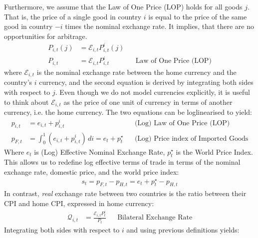 Furthermore, we assume that the Law of One Price (LOP) holds for all goods $j$. That is, the price of a single good in country $i$ is equal to the price of the same good in country $-i$ times the nominal exchange rate. It implies, that there are no opportunities for arbitrage.
\begin{align}
    P_{i,t}(j) & = \mathcal{E}_{i,t}P_{i,t}^i(j)                                                                         &  &               \\
    P_{i,t}    & = \mathcal{E}_{i,t}P_{i,t}^i                                                                            &  & \text{Law of One Price (LOP)}              
\end{align}
where $\mathcal{E}_{i,t}$ is the nominal exchange rate between the home currency and the country's $i$ currency, and the second equation is derived by integrating both sides with respect to $j$. Even though we do not model currencies explicitly, it is useful to think about $\mathcal{E}_{i,t}$ as the price of one unit of currency in terms of another currency, i.e. the home currency. The two equations can be loglinearised to yield:
\begin{align}
    p_{i,t}    & = e_{i,t}+p_{i,t}^i                                                                                     &  & \text{(Log) Law of One Price (LOP)}        \\
    p_{F,t}    & = \int_{0}^{1}(e_{i,t}+p_{i,t}^i) \,di = e_t + p_t^{\star} \label{eq:log_price_index_of_imported_goods} &  & \text{(Log) Price index of Imported Goods}
\end{align}
Where $e_t$ is (Log) Effective Nominal Exchange Rate, $p_t^{\star}$ is the World Price Index. This allows us to redefine log effective terms of trade in terms of the nominal exchange rate, domestic price, and the world price index:
\begin{align}
    s_t = p_{F,t} - p_{H,t} = e_t + p_t^{\star} - p_{H,t} \label{eq:terms_of_trade_with_world_price_index}
\end{align}
In contrast, \textit{real} exchange rate between two countries is the ratio between their CPI and home CPI, expressed in home currency:
\begin{align}
    \mathcal{Q}_{i,t} & = \frac{\mathcal{E}_{i,t}P_{t}^i}{P_t}                                        &  & \text{Bilateral Exchange Rate}                                       
\end{align}
Integrating both sides with respect to $i$ and using previous definitions yields:
